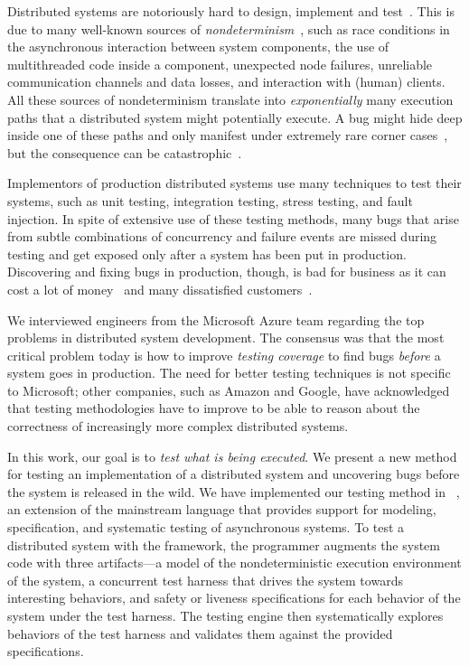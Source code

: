 Distributed systems are notoriously hard to design, implement and test~\cite{cavage2013there, laguna2015debugging, maddox2015test}. This is due to many well-known sources of \emph{nondeterminism}~\cite{chandra2007paxos}, such as race conditions in the asynchronous interaction between system components, the use of multithreaded code inside a component, unexpected node failures, unreliable communication channels and data losses, and interaction with (human) clients.
All these sources of nondeterminism translate into \emph{exponentially} many execution paths that a distributed system might potentially execute.
A bug might hide deep inside one of these paths and only manifest under extremely rare corner cases~\cite{gray1986computers, musuvathi2008finding}, but the consequence can be catastrophic~\cite{amazon2012aws, google2014outage}.

Implementors of production distributed systems use many techniques to test their systems,
such as unit testing, integration testing, stress testing, and fault injection.
In spite of extensive use of these testing methods,
many bugs that arise from subtle combinations of concurrency and failure events
are missed during testing and get exposed only after a system has been put in production.
Discovering and fixing bugs in production, though, is bad for business as it can cost a lot of money~\cite{tassey2002economic} 
and many dissatisfied customers~\cite{amazon2012aws, google2014outage}.

We interviewed engineers from the Microsoft Azure team regarding the top problems in distributed system development.
The consensus was that the most critical problem today is how to improve \emph{testing coverage} to find bugs \emph{before} a system goes in production.
The need for better testing techniques is not specific to Microsoft;
other companies, such as Amazon and Google, have acknowledged~\cite{chandra2007paxos,newcombe2015aws} that testing methodologies have to improve to be able to reason about the correctness of increasingly more complex distributed systems. 

In this work, our goal is to \emph{test what is being executed}.
We present a new method for testing an implementation of a distributed system and uncovering bugs before the system is released in the wild.
We have implemented our testing method in \psharp~\cite{deligiannis2015psharp}, an extension of the mainstream language \csharp that provides
support for modeling, specification, and systematic testing of asynchronous systems.
To test a distributed system with the \psharp framework, the programmer augments the system code with three artifacts---a model of the nondeterministic execution environment of the system, a concurrent test harness that drives the system towards interesting behaviors, and safety or liveness specifications for each behavior of the system under the test harness.
The \psharp testing engine then systematically explores behaviors of the test harness and validates them against the provided specifications.

